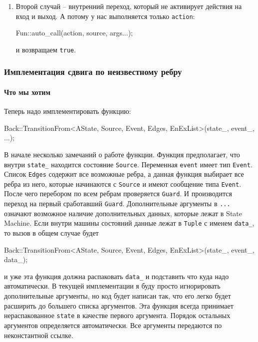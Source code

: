 \documentclass{article}
\begin{document}
{\begin{enumerate}
\begin{enumerate}
\item Заменить старое состояние на новое
\begin{cppcode}[\nonumbers]
 current = std::move(target);
\end{cppcode}
и вернуть \verb"true", так как переход произошел.
\end{enumerate}

\item Второй случай -- внутренний переход, который не активирует действия на вход и выход.
А потому у нас выполняется только \verb"action":
\begin{cppcode}[\nonumbers]
Fun::auto_call(action, source, args...);
\end{cppcode}
и возвращаем \verb"true".
\end{enumerate}

\subsubsection{Имплементация сдвига по неизвестному ребру}

\paragraph{Что мы хотим}

Теперь надо имплементировать функцию:
\begin{cppcode}[\nonumbers]
Back::TransitionFrom<AState, Source, Event, Edges, EnExList>(state_, event_, ...);
\end{cppcode}
В начале несколько замечаний о работе функции.
Функция предполагает, что внутри \verb"state_" находится состояние \verb"Source".
Переменная \verb"event" имеет тип \verb"Event".
Список \verb"Edges" содержит все возможные ребра, а данная функция выбирает все ребра из него, которые начинаются с \verb"Source" и имеют сообщение типа \verb"Event".
После чего перебором по всем ребрам проверяется \verb"Guard".
И производится переход на первый сработавший \verb"Guard".
Дополнительные аргументы в \verb"..." означают возможное наличие дополнительных данных, которые лежат в State Machine.
Если внутри машины состояний данные лежат в \verb"Tuple" с именем \verb"data_", то вызов в общем случае будет
\begin{cppcode}[\nonumbers]
Back::TransitionFrom<AState, Source, Event, Edges, EnExList>(state_, event_, data_);
\end{cppcode}
и уже эта функция должна распаковать \verb"data_" и подставить что куда надо автоматически.
В текущей имплементации я буду просто игнорировать дополнительные аргументы, но код будет написан так, что его легко будет расширить до большего списка аргументов.
Эта функция всегда принимает нераспакованное \verb"state" в качестве первого аргумента.
Порядок остальных аргументов определяется автоматически.
Все аргументы передаются по неконстантной ссылке.

}
\end{document}
